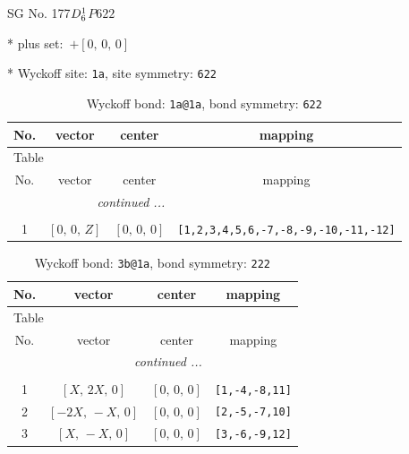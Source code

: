 \documentclass[fleqn,8pt]{jsarticle}
\begin{document}
\setcounter{MaxMatrixCols}{32}

\renewcommand{\tablename}{Table~}
\renewcommand{\figurename}{Figure~}
\begin{center}
\LARGE
SG No. 177\quad$D_{\rm 6}^{1}$\quad$P622$\quad[ hexagonal ]
\end{center}

* plus set:\,\,\,$+\left[ 0,\, 0,\, 0 \right]$


* Wyckoff site: {\tt 1a}, site symmetry: {\tt 622}
\renewcommand{\arraystretch}{1.2}
\begin{longtable}{cccc}
\caption{Wyckoff bond: {\tt 1a@1a}, bond symmetry: {\tt 622}}
 \\
 \hline \hline
No. & vector & center & mapping \\ \hline \endfirsthead

\multicolumn{3}{l}{\tablename\ \thetable{}} \\
 \hline \hline
No. & vector & center & mapping \\ \hline \endhead

 \hline \hline
\multicolumn{3}{r}{\footnotesize\it continued ...} \\ \endfoot

 \hline \hline
\multicolumn{3}{r}{} \\ \endlastfoot

1 & $\left[ 0,\, 0,\, Z \right]$ & $\left[ 0,\, 0,\, 0 \right]$ & {\tt [1,2,3,4,5,6,-7,-8,-9,-10,-11,-12]} \\
\end{longtable}
\renewcommand{\arraystretch}{1.2}
\begin{longtable}{cccc}
\caption{Wyckoff bond: {\tt 3b@1a}, bond symmetry: {\tt 222}}
 \\
 \hline \hline
No. & vector & center & mapping \\ \hline \endfirsthead

\multicolumn{3}{l}{\tablename\ \thetable{}} \\
 \hline \hline
No. & vector & center & mapping \\ \hline \endhead

 \hline \hline
\multicolumn{3}{r}{\footnotesize\it continued ...} \\ \endfoot

 \hline \hline
\multicolumn{3}{r}{} \\ \endlastfoot

1 & $\left[ X,\, 2 X,\, 0 \right]$ & $\left[ 0,\, 0,\, 0 \right]$ & {\tt [1,-4,-8,11]} \\ \hline
2 & $\left[ - 2 X,\, - X,\, 0 \right]$ & $\left[ 0,\, 0,\, 0 \right]$ & {\tt [2,-5,-7,10]} \\ \hline
3 & $\left[ X,\, - X,\, 0 \right]$ & $\left[ 0,\, 0,\, 0 \right]$ & {\tt [3,-6,-9,12]} \\
\end{longtable}
\end{document}
